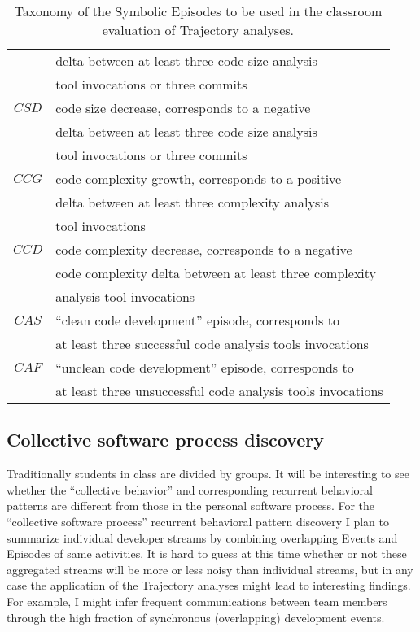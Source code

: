 \begin{table}
\begin{center}
\begin{tabular}{ | c | l | }
													& delta between at least three code size analysis \\
													& tool invocations or three commits \\
		\hline
		$CSD$ 								& code size decrease, corresponds to a negative \\
													& delta between at least three code size analysis \\
													& tool invocations or three commits \\																										
		\hline
		$CCG$ 								& code complexity growth, corresponds to a positive \\
													& delta between at least three complexity analysis \\
													& tool invocations \\
		\hline
		$CCD$ 								& code complexity decrease, corresponds to a negative \\
													& code complexity delta between at least three complexity \\
													& analysis tool invocations \\													
		\hline
		$CAS$ 								& ``clean code development'' episode, corresponds to \\
													& at least three successful code analysis tools invocations \\
		\hline
		$CAF$ 								& ``unclean code development'' episode, corresponds to \\
													& at least three unsuccessful code analysis tools invocations \\
		\hline		
	  \end{tabular}
    \caption{Taxonomy of the Symbolic Episodes to be used in the classroom evaluation of Trajectory analyses.}
    \label{fig:data_collected_intervals}
    \end{center}
\end{table}

\subsection{Collective software process discovery}
Traditionally students in class are divided by groups. It will be interesting to see whether the ``collective behavior'' and corresponding recurrent behavioral patterns are different from those in the personal software process. For the ``collective software process'' recurrent behavioral pattern discovery I plan to summarize individual developer streams by combining overlapping Events and Episodes of same activities. It is hard to guess at this time whether or not these aggregated streams will be more or less noisy than individual streams, but in any case the application of the Trajectory analyses might lead to interesting findings. For example, I might infer frequent communications between team members through the high fraction of synchronous (overlapping) development events.
